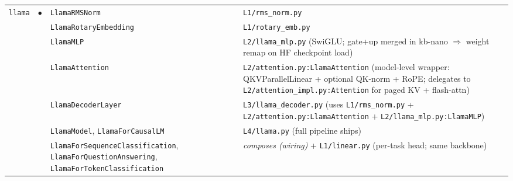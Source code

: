 \documentclass[10pt]{article}
\begin{document}
{\begin{longtable}{@{}p{1.6cm} c p{4.0cm} p{14.5cm}@{}}
\multirow{7}{*}{\texttt{llama}} & \multirow{7}{*}{$\bullet$}
   & \texttt{LlamaRMSNorm}            & \texttt{L1/rms\_norm.py} \\
&& \texttt{LlamaRotaryEmbedding}      & \texttt{L1/rotary\_emb.py} \\
&& \texttt{LlamaMLP}                  & \texttt{L2/llama\_mlp.py} (SwiGLU; gate+up merged in kb-nano $\Rightarrow$ weight remap on HF checkpoint load) \\
&& \texttt{LlamaAttention}            & \texttt{L2/attention.py:LlamaAttention} (model-level wrapper: QKVParallelLinear + optional QK-norm + RoPE; delegates to \texttt{L2/attention\_impl.py:Attention} for paged KV + flash-attn) \\
&& \texttt{LlamaDecoderLayer}         & \texttt{L3/llama\_decoder.py} (uses \texttt{L1/rms\_norm.py} + \texttt{L2/attention.py:LlamaAttention} + \texttt{L2/llama\_mlp.py:LlamaMLP}) \\
&& \texttt{LlamaModel}, \texttt{LlamaForCausalLM} & \texttt{L4/llama.py} (full pipeline ships) \\
&& \texttt{LlamaForSequenceClassification}, \texttt{LlamaForQuestionAnswering}, \texttt{LlamaForTokenClassification} & \textit{composes (wiring)} + \texttt{L1/linear.py} (per-task head; same backbone) \\
\midrule


\end{longtable}}
\end{document}

